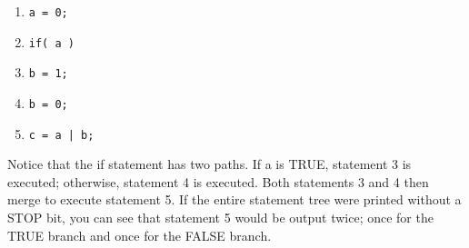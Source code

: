 \begin{enumerate}
\item 
\footnotesize\begin{verbatim}a = 0; \end{verbatim}\normalsize 
\item 
\footnotesize\begin{verbatim}if( a ) \end{verbatim}\normalsize 
\item 
\footnotesize\begin{verbatim}b = 1; \end{verbatim}\normalsize 
\item 
\footnotesize\begin{verbatim}b = 0; \end{verbatim}\normalsize 
\item 
\footnotesize\begin{verbatim}c = a | b; \end{verbatim}\normalsize 
\end{enumerate}


 Notice that the if statement has two paths. If a is TRUE, statement 3 is executed; otherwise, statement 4 is executed. Both statements 3 and 4 then merge to execute statement 5. If the entire statement tree were printed without a STOP bit, you can see that statement 5 would be output twice; once for the TRUE branch and once for the FALSE branch.


